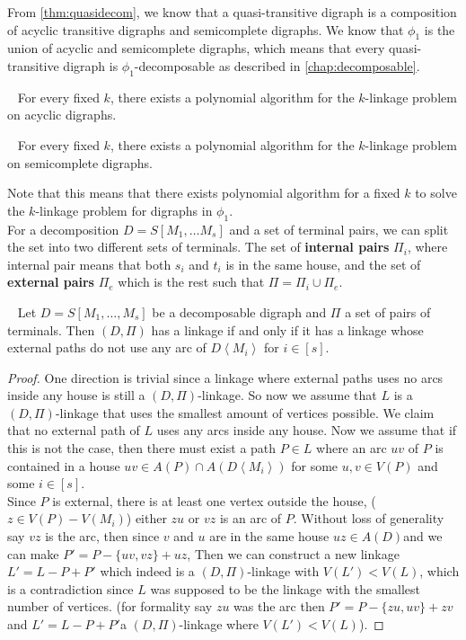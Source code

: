 From \autoref{thm:quasidecom}, we know that a quasi-transitive digraph is a composition of acyclic transitive digraphs and semicomplete digraphs.
We know that $\phi_1$ is the union of acyclic and semicomplete digraphs, which means that every quasi-transitive digraph is $\phi_1$-decomposable as described in \autoref{chap:decomposable}. 
\begin{thm}~\cite{bangJGT85}
    For every fixed $k$, there exists a polynomial algorithm for the $k$-linkage problem on acyclic digraphs.
    \label{thm:acyclicklink}
\end{thm}
\begin{thm}~\cite{chudnovskyAM270}
    For every fixed $k$, there exists a polynomial algorithm for the $k$-linkage problem on semicomplete digraphs.
    \label{thm:semiklink}
\end{thm}
Note that this means that there exists polynomial algorithm for a fixed $k$ to solve the $k$-linkage problem for digraphs in $\phi_1$.\\
For a decomposition $D=S[M_1,\dots M_s]$ and a set of terminal pairs, we can split the set into two different sets of terminals. 
The set of \textbf{internal pairs} $\Pi_i$, where internal pair means that both $s_i$ and $t_i$ is in the same house, and the set of \textbf{external pairs} $\Pi_e$ which is the rest such that $\Pi=\Pi_i \cup \Pi_e$.\\
\begin{lemma}~\cite{bangJGT85}
    Let $D=S[M_1,\dots ,M_s]$ be a decomposable digraph and $\Pi$ a set of pairs of terminals. Then $(D,\Pi)$ has a linkage if and only if it has a linkage whose external paths do not use any arc of $D\left<M_i\right>$ for $i\in [s]$.
    \label{lemma:externalhouse}
\end{lemma}
\begin{proof}
    One direction is trivial since a linkage where external paths uses no arcs inside any house is still a $(D,\Pi)$-linkage.
    So now we assume that $L$ is a $(D,\Pi)$-linkage that uses the smallest amount of vertices possible. 
    We claim that no external path of $L$ uses any arcs inside any house. 
    Now we assume that if this is not the case, then there must exist a path $P\in L$ where an arc $uv$ of $P$ is contained in a house $uv\in A(P)\cap A(D\left<M_i\right>)$ for some $u,v\in V(P)$ and some $i\in [s]$.\\
    Since $P$ is external, there is at least one vertex outside the house, ($z\in V(P)-V(M_i)$) either $zu$ or $vz$ is an arc of $P$.
    Without loss of generality say $vz$ is the arc, then since $v$ and $u$ are in the same house $uz\in A(D)$and we can make $P'=P-\lbrace uv,vz\rbrace + uz$, Then we can construct a new linkage $L'=L-P+P'$ which indeed is a $(D,\Pi)$-linkage with $V(L')<V(L)$, which is a contradiction since $L$ was supposed to be the linkage with the smallest number of vertices. 
    (for formality say $zu$ was the arc then $P'=P-\lbrace zu,uv\rbrace +zv$ and $L'=L-P+P'$a $(D,\Pi)$-linkage where $V(L')<V(L)$).
\end{proof}
